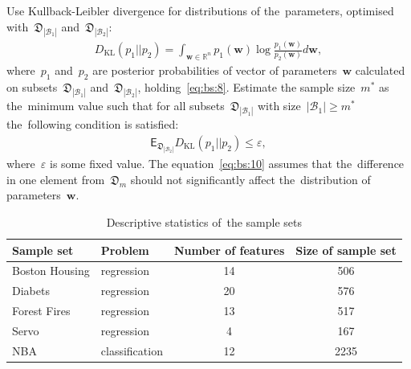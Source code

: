 \documentclass[
11pt,%
tightenlines,%
twoside,%
onecolumn,%
nofloats,%
nobibnotes,%
nofootinbib,%
superscriptaddress,%
noshowpacs,%
centertags]%
{revtex4}
\begin{document}
Use Kullback-Leibler divergence for distributions of the~parameters, optimised with~$\mathfrak{D}_{|\mathcal{B}_1|}$ and~$\mathfrak{D}_{|\mathcal{B}_2|}$:
\[
\label{eq:bs:9}
\begin{aligned}
	D_\text{KL}\left(p_1 || p_2\right) = \int_{\mathbf{w}\in\mathbb{R}^{n}}p_1(\mathbf{w})\log\frac{p_1(\mathbf{w})}{p_2(\mathbf{w})}d\mathbf{w},
\end{aligned}
\]
where~$p_1$ and~$p_2$ are posterior probabilities of vector of parameters~$\mathbf{w}$ calculated on subsets~$\mathfrak{D}_{|\mathcal{B}_1|}$ and~$\mathfrak{D}_{|\mathcal{B}_2|}$, holding~\eqref{eq:bs:8}.
Estimate the sample size~$m^*$ as the~minimum value such that for all subsets~$\mathfrak{D}_{|\mathcal{B}_1|}$ with size~$|\mathcal{B}_1|\geq m^*$ the~following condition is satisfied:
\[
\label{eq:bs:10}
\begin{aligned}
	\mathsf{E}_{\mathfrak{D}_{|\mathcal{B}_2|}}D_\text{KL}\left(p_1 || p_2\right) \leq \varepsilon,
\end{aligned}
\]
where~$\varepsilon$ is some fixed value. The equation~\eqref{eq:bs:10} assumes that the~difference in one element from~$\mathfrak{D}_m$ should not significantly affect the~distribution of parameters~$\mathbf{w}$. 

\begin{table}[!htp]
\centering
\caption{ Descriptive statistics of~the sample sets}
\label{table20}
\begin{tabular}{l|l|c|c}
\hline
	\centering Sample set & Problem & Number of features & Size of sample set\\ 
	\hline 	Boston Housing 	&regression		&14 & 506\\
	\hline	Diabets 				& regression		&20 & 576\\
	\hline	Forest Fires 			& regression		& 13 & 517\\
 	\hline	Servo 					& regression 	& 4 & 167\\
	\hline	NBA				 		& classification	& 12 & 2235\\
\hline
\end{tabular}
\end{table} 
	 
\end{document}
